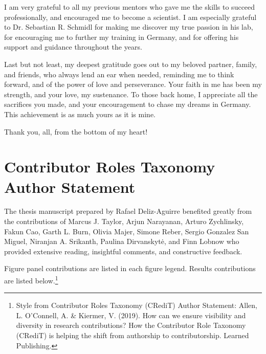 I am very grateful to all my previous mentors who gave me the skills to succeed professionally, and encouraged me to become a scientist. I am especially grateful to Dr. Sebastian R. Schmidl for making me discover my true passion in his lab, for encouraging me to further my training in Germany, and for offering his support and guidance throughout the years.

Last but not least, my deepest gratitude goes out to my beloved partner, family, and friends, who always lend an ear when needed, reminding me to think forward, and of the power of love and perseverance. Your faith in me has been my strength, and your love, my sustenance. To those back home, I appreciate all the sacrifices you made, and your encouragement to chase my dreams in Germany. This achievement is as much yours as it is mine.

Thank you, all, from the bottom of my heart!

\chapter*{Contributor Roles Taxonomy Author Statement}
The thesis manuscript prepared by Rafael Deliz-Aguirre benefited greatly from the contributions of Marcus J. Taylor, Arjun Narayanan, Arturo Zychlinsky, Fakun Cao, Garth L. Burn, Olivia Majer, Simone Reber, Sergio Gonzalez San Miguel, Niranjan A. Srikanth, Paulina Dirvanskytė, and Finn Lobnow who provided extensive reading, insightful comments, and constructive feedback.

Figure panel contributions are listed in each figure legend. Results contributions are listed below.\footnote{Style from Contributor Roles Taxonomy (CRediT) Author Statement: Allen, L. O’Connell, A. \& Kiermer, V. (2019). How can we ensure visibility and diversity in research contributions? How the Contributor Role Taxonomy (CRediT) is helping the shift from authorship to contributorship. Learned Publishing.}

